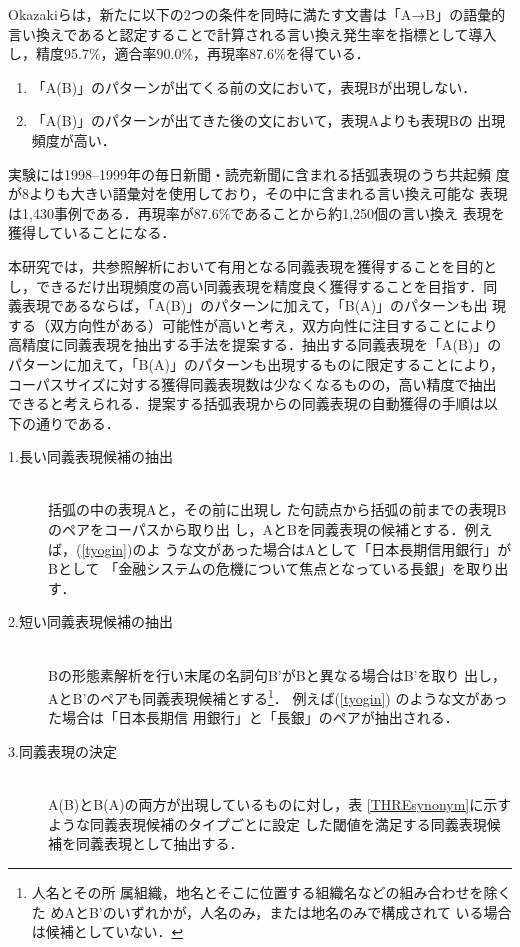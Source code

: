 \documentclass[japanese]{jnlp_1.4}
\def\ex#1{}
\begin{document}
  Okazakiらは，新たに以下の2つの条件を同時に満たす文書は「A→B」の語彙的
  言い換えであると認定することで計算される言い換え発生率を指標として導入
  し，精度95.7\%，適合率90.0\%，再現率87.6\%を得ている．

  \begin{enumerate}
   \item 「A(B)」のパターンが出てくる前の文において，表現Bが出現しない．
   \item 「A(B)」のパターンが出てきた後の文において，表現Aよりも表現Bの
	 出現頻度が高い．
  \end{enumerate}
  実験には1998--1999年の毎日新聞・読売新聞に含まれる括弧表現のうち共起頻
  度が8よりも大きい語彙対を使用しており，その中に含まれる言い換え可能な
  表現は1,430事例である．再現率が87.6\%であることから約1,250個の言い換え
  表現を獲得していることになる．
  
  本研究では，共参照解析において有用となる同義表現を獲得することを目的と
  し，できるだけ出現頻度の高い同義表現を精度良く獲得することを目指す．同
  義表現であるならば，「A(B)」のパターンに加えて，「B(A)」のパターンも出
  現する（双方向性がある）可能性が高いと考え，双方向性に注目することにより
  高精度に同義表現を抽出する手法を提案する．抽出する同義表現を「A(B)」の
  パターンに加えて，「B(A)」のパターンも出現するものに限定することにより，
  コーパスサイズに対する獲得同義表現数は少なくなるものの，高い精度で抽出
  できると考えられる．提案する括弧表現からの同義表現の自動獲得の手順は以
  下の通りである．
  \begin{description}
   \item[1.長い同義表現候補の抽出]\ \\ 括弧の中の表現Aと，その前に出現し
	      た句読点から括弧の前までの表現Bのペアをコーパスから取り出
	      し，AとBを同義表現の候補とする．例えば，(\ref{tyogin})のよ
	      うな文があった場合はAとして「日本長期信用銀行」がBとして
	      「金融システムの危機について焦点となっている長銀」を取り出
	      す．

	      \ex{現在のところ，金融システムの危機について焦点となってい
	      る\textgt{長銀}\textgt{（日本長期信用銀行）}に関して
	      は，…．\label{tyogin}}

   \item[2.短い同義表現候補の抽出]\ \\ 
	      Bの形態素解析を行い末尾の名詞句B'がBと異なる場合はB'を取り
	      出し，AとB'のペアも同義表現候補とする\footnote{人名とその所
	      属組織，地名とそこに位置する組織名などの組み合わせを除くた
	      めAとB'のいずれかが，人名のみ，または地名のみで構成されて
	      いる場合は候補としていない．}．
	      例えば(\ref{tyogin}) のような文があった場合は「日本長期信
	      用銀行」と「長銀」のペアが抽出される．
   \item[3.同義表現の決定]\ \\ 	      
	      A(B)とB(A)の両方が出現しているものに対し，表
	      \ref{THREsynonym}に示すような同義表現候補のタイプごとに設定
	      した閾値を満足する同義表現候補を同義表現として抽出する．
  \end{description}
\end{document}
